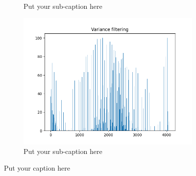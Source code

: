 \documentclass{article}
\begin{document}
\begin{figure}[ht]
\begin{subfigure}{.33\textwidth}
  \caption{Put your sub-caption here}
  \label{fig:sub-second}
\end{subfigure}
\begin{subfigure}{.33\textwidth}
  \centering
  \includegraphics[width=1\linewidth]{1b/Figure_1.png}  
  \caption{Put your sub-caption here}
  \label{fig:sub-second}
\end{subfigure}
\caption{Put your caption here}
\label{imp feat}
\end{figure}
\end{document}
